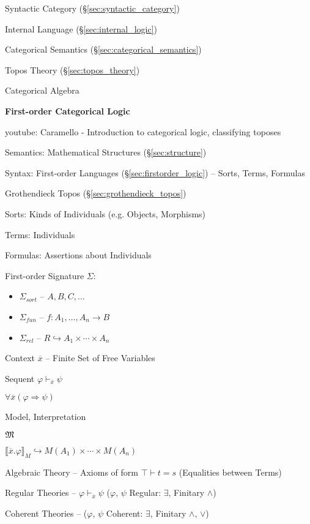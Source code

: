 Syntactic Category (\S\ref{sec:syntactic_category})

Internal Language (\S\ref{sec:internal_logic})

Categorical Semantics (\S\ref{sec:categorical_semantics})

Topos Theory (\S\ref{sec:topos_theory})

Categorical Algebra


\textbf{First-order Categorical Logic}

youtube: Caramello - Introduction to categorical logic, classifying
toposes

Semantics: Mathematical Structures (\S\ref{sec:structure})

Syntax: First-order Languages (\S\ref{sec:firstorder_logic}) --
Sorts, Terms, Formulas

Grothendieck Topos (\S\ref{sec:grothendieck_topos})

Sorts: Kinds of Individuals (e.g. Objects, Morphisms) %

Terms: Individuals

Formulas: Assertions about Individuals


First-order Signature $\Sigma$:
\begin{itemize}
  \item $\Sigma_{sort}$ -- $A,B,C,\ldots$
  \item $\Sigma_{fun}$ -- $f : A_1, \ldots, A_n \rightarrow B$
  \item $\Sigma_{rel}$ -- $R \hookrightarrow A_1 \times \cdots \times
    A_n$
\end{itemize}

Context $\overline{x}$ -- Finite Set of Free Variables

Sequent $\varphi \vdash_{\overline{x}} \psi$

$\forall \overline{x} (\varphi \Rightarrow \psi)$

Model, Interpretation

$\mathfrak{M}$

$\llbracket \overline{x}.\varphi \rrbracket_M \hookrightarrow M(A_1)
\times \cdots \times M(A_n)$


Algebraic Theory -- Axioms of form $\top \vdash t = s$ (Equalities
between Terms)

Regular Theories -- $\varphi \vdash_{\overline{x}} \psi$ ($\varphi$,
$\psi$ Regular: $\exists$, Finitary $\wedge$)

Coherent Theories -- ($\varphi$, $\psi$ Coherent: $\exists$, Finitary
$\wedge$, $\vee$)

